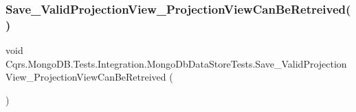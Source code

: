 \subsubsection{\texorpdfstring{Save\+\_\+\+Valid\+Projection\+View\+\_\+\+Projection\+View\+Can\+Be\+Retreived()}{Save\_ValidProjectionView\_ProjectionViewCanBeRetreived()}}
{\footnotesize\ttfamily void Cqrs.\+Mongo\+D\+B.\+Tests.\+Integration.\+Mongo\+Db\+Data\+Store\+Tests.\+Save\+\_\+\+Valid\+Projection\+View\+\_\+\+Projection\+View\+Can\+Be\+Retreived (\begin{DoxyParamCaption}{ }\end{DoxyParamCaption})}

